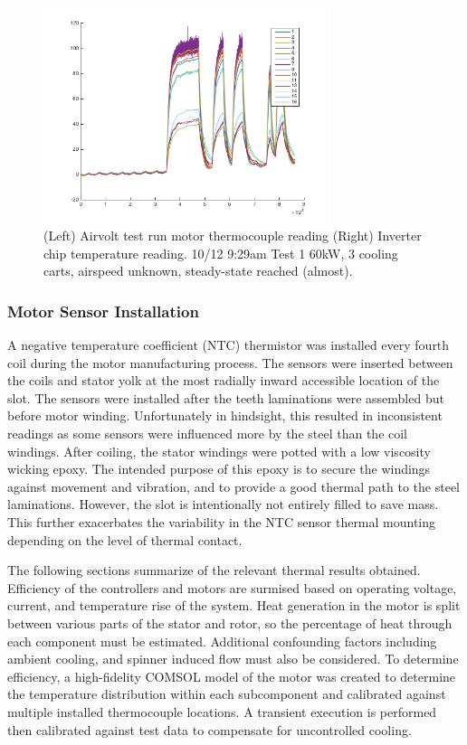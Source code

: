 \documentclass[]{aiaa-tc}%
\begin{document}
\begin{figure}[!htb]%
	\centering
	\includegraphics[width=0.75\textwidth]{figures/AirvoltMotor.png}
	\caption{(Left) Airvolt test run motor thermocouple reading (Right) Inverter chip temperature reading.
    10/12 9:29am Test 1 60kW, 3 cooling carts, airspeed unknown, steady-state reached (almost).}
	\label{fig:airvoltData}
\end{figure}

\subsubsection{Motor Sensor Installation}
A negative temperature coefficient (NTC) thermistor was installed every fourth coil during the motor manufacturing process. The sensors were inserted between the coils and stator yolk at the most radially inward accessible location of the slot. The sensors were installed after the teeth laminations were assembled but before motor winding. Unfortunately in hindsight, this resulted in inconsistent readings as some sensors were influenced more by the steel than the coil windings. After coiling, the stator windings were potted with a low viscosity wicking epoxy. The intended purpose of this epoxy is to secure the windings against movement and vibration, and to provide a good thermal path to the steel laminations. However, the slot is intentionally not entirely filled to save mass. This further exacerbates the variability in the NTC sensor thermal mounting depending on the level of thermal contact.

The following sections summarize of the relevant thermal results obtained. Efficiency of the controllers and motors are surmised based on operating voltage, current, and temperature rise of the system. Heat generation in the motor is split between various parts of the stator and rotor, so the percentage of heat through each component must be estimated. Additional confounding factors including ambient cooling, and spinner induced flow must also be considered. To determine efficiency, a high-fidelity COMSOL model of the motor was created to determine the temperature distribution within each subcomponent and calibrated against multiple installed thermocouple locations. A transient execution is performed then calibrated against test data to compensate for uncontrolled cooling.
\end{document}
